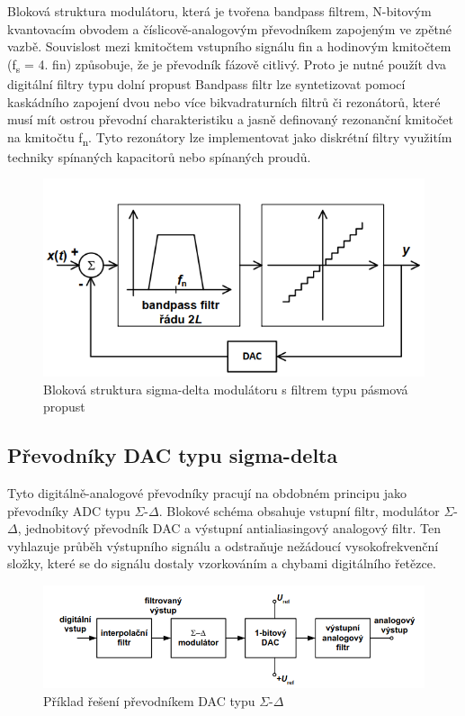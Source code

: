 Bloková struktura modulátoru, která je tvořena bandpass filtrem, N-bitovým kvantovacím obvodem a číslicově-analogovým převodníkem zapojeným ve zpětné vazbě. Souvislost mezi kmitočtem vstupního signálu fin a hodinovým kmitočtem (f\textsubscript{s} = 4. fin) způsobuje, že je převodník fázově citlivý. Proto je nutné použít dva digitální filtry typu dolní propust Bandpass filtr lze syntetizovat pomocí kaskádního zapojení dvou nebo více bikvadraturních filtrů či rezonátorů, které musí mít ostrou převodní charakteristiku a jasně definovaný rezonanční kmitočet na kmitočtu f\textsubscript{n}. Tyto rezonátory lze implementovat jako diskrétní filtry využitím techniky spínaných kapacitorů nebo spínaných proudů.
\begin{figure}[h]
   \begin{center}
     \includegraphics[scale=0.6]{images/sigmaBP.png}
   \end{center}
   \caption{Bloková struktura sigma-delta modulátoru s filtrem typu pásmová propust}
\end{figure}

\subsection{Převodníky DAC typu sigma-delta}
Tyto digitálně-analogové převodníky pracují na obdobném principu jako převodníky ADC typu $\Sigma$-$\Delta$. Blokové schéma obsahuje vstupní filtr, modulátor $\Sigma$-$\Delta$, jednobitový převodník DAC a výstupní antialiasingový analogový filtr. Ten vyhlazuje průběh výstupního signálu a odstraňuje nežádoucí vysokofrekvenční složky, které se do signálu dostaly vzorkováním a chybami digitálního řetězce.

\begin{figure}[h]
   \begin{center}
     \includegraphics[scale=0.6]{images/sigmadac.png}
   \end{center}
   \caption{Příklad řešení převodníkem DAC typu $\Sigma$-$\Delta$}
\end{figure}

